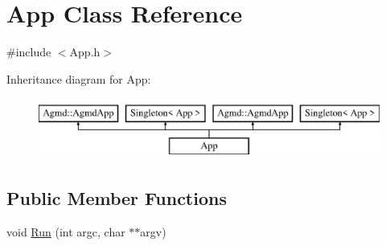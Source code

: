 \hypertarget{class_app}{\section{App Class Reference}
\label{class_app}
}


{\ttfamily \#include $<$App.\-h$>$}

Inheritance diagram for App\-:\begin{figure}[H]
\begin{center}
\leavevmode
\includegraphics[height=2.000000cm]{class_app}
\end{center}
\end{figure}
\subsection*{Public Member Functions}
\begin{DoxyCompactItemize}
\item 
void \hyperlink{class_app_a92c5c3d8799fe937ea0179b4efb1f4d3}{Run} (int argc, char $\ast$$\ast$argv)
\end{DoxyCompactItemize}
